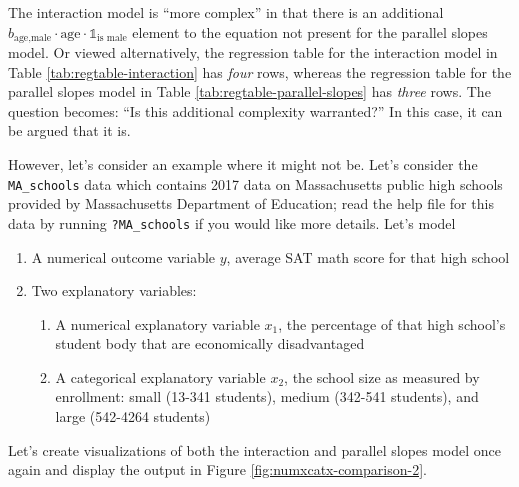 \documentclass[12pt, krantz2,]{krantz}
\providecommand{\tightlist}{%
  \setlength{\itemsep}{0pt}\setlength{\parskip}{0pt}}
\begin{document}
The interaction model is ``more complex'' in that there is an additional \(b_{\mbox{age,male}} \cdot \mbox{age} \cdot \mathbb{1}_{\mbox{is male}}\) element to the equation not present for the parallel slopes model. Or viewed alternatively, the regression table for the interaction model in Table \ref{tab:regtable-interaction} has \emph{four} rows, whereas the regression table for the parallel slopes model in Table \ref{tab:regtable-parallel-slopes} has \emph{three} rows. The question becomes: ``Is this additional complexity warranted?'' In this case, it can be argued that it is.

However, let's consider an example where it might not be. Let's consider the \texttt{MA\_schools} data which contains 2017 data on Massachusetts public high schools provided by Massachusetts Department of Education; read the help file for this data by running \texttt{?MA\_schools} if you would like more details. Let's model

\begin{enumerate}
\def\labelenumi{\arabic{enumi}.}
\tightlist
\item
  A numerical outcome variable \(y\), average SAT math score for that high school
\item
  Two explanatory variables:

  \begin{enumerate}
  \def\labelenumii{\arabic{enumii}.}
  \tightlist
  \item
    A numerical explanatory variable \(x_1\), the percentage of that high school's student body that are economically disadvantaged
  \item
    A categorical explanatory variable \(x_2\), the school size as measured by enrollment: small (13-341 students), medium (342-541 students), and large (542-4264 students)
  \end{enumerate}
\end{enumerate}

Let's create visualizations of both the interaction and parallel slopes model once again and display the output in Figure \ref{fig:numxcatx-comparison-2}.
\end{document}
